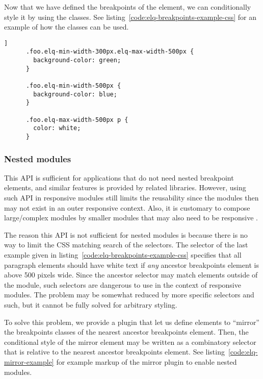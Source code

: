 \documentclass{acm_proc_article-sp}
\begin{document}
    Now that we have defined the breakpoints of the element, we can conditionally style it by using the classes.
    See listing~\ref{code:elq-breakpoints-example-css} for an example of how the classes can be used.

    \begin{lstlisting}[gobble=6,caption={},captionpos=b,label={code:elq-breakpoints-example-css}]]
      .foo.elq-min-width-300px.elq-max-width-500px {
        background-color: green;
      }

      .foo.elq-min-width-500px {
        background-color: blue;
      }

      .foo.elq-max-width-500px p {
        color: white;
      }
    \end{lstlisting}

    \subsubsection{Nested modules}
      This API is sufficient for applications that do not need nested breakpoint elements, and similar features is provided by related libraries.
      However, using such API in responsive modules still limits the reusability since the modules then may not exist in an outer responsive context.
      Also, it is customary to compose large/complex modules by smaller modules that may also need to be responsive \cite{parnas1972criteria}.

      The reason this API is not sufficient for nested modules is because there is no way to limit the CSS matching search of the selectors.
      The selector of the last example given in listing~\ref{code:elq-breakpoints-example-css} specifies that all paragraph elements should have white text if \emph{any} ancestor breakpoints element is above 500 pixels wide.
      Since the ancestor selector may match elements outside of the module, such selectors are dangerous to use in the context of responsive modules.
      The problem may be somewhat reduced by more specific selectors and such, but it cannot be fully solved for arbitrary styling.

      To solve this problem, we provide a plugin that let us define elements to ``mirror'' the breakpoints classes of the nearest ancestor breakpoints element.
      Then, the conditional style of the mirror element may be written as a combinatory selector that is relative to the nearest ancestor breakpoints element.
      See listing~\ref{code:elq-mirror-example} for example markup of the mirror plugin to enable nested modules.
\end{document}
